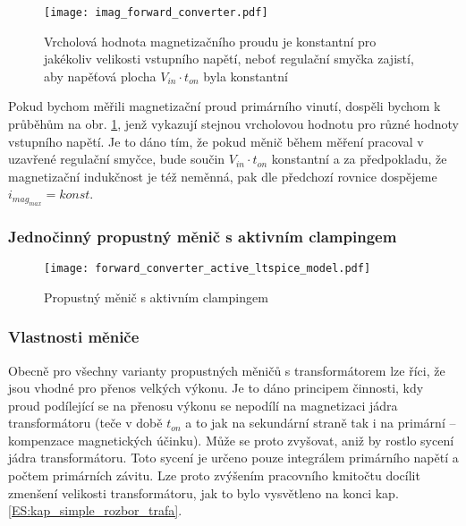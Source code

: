       \begin{figure}[ht!]
      \centering
      \texttt{[image: imag\_forward\_converter.pdf]}
      \caption[Magnetizační proud]{Vrcholová hodnota magnetizačního proudu je konstantní pro
               jakékoliv velikosti vstupního napětí, neboť regulační smyčka zajistí, aby napěťová
               plocha $V_{in}\cdot t_{on}$ byla konstantní}
      \label{enz:fig_imag_forward_converter}
      \end{figure}
      
      Pokud bychom měřili magnetizační proud primárního vinutí, dospěli bychom k průběhům na obr.
      \ref{enz:fig_imag_forward_converter}, jenž vykazují stejnou vrcholovou hodnotu pro různé hodnoty
      vstupního napětí. Je to dáno tím, že pokud měnič během měření pracoval v uzavřené regulační
      smyčce, bude součin $V_{in}\cdot t_{on}$ konstantní a za předpokladu, že magnetizační indukčnost
      je též neměnná, pak dle předchozí rovnice dospějeme $i_{mag_{max}} = konst$.
     
    \subsubsection{Jednočinný propustný měnič s aktivním clampingem}\label{ENZ:kap_afwdconv}  
      \begin{figure*}[ht!]
        \centering
        \texttt{[image: forward\_converter\_active\_ltspice\_model.pdf]}
        \caption[Propustný měnič s aktivním clampingem]{Propustný měnič s aktivním clampingem}
        \label{enz:fig_imag_a_lt_frwd_conv}
      \end{figure*}   
      
    \subsubsection{Vlastnosti měniče}
      Obecně pro všechny varianty  propustných měničů s transformátorem lze říci, že jsou vhodné pro
      přenos velkých výkonu. Je to dáno principem činnosti, kdy proud podílející se na přenosu výkonu
      se nepodílí na magnetizaci jádra transformátoru (teče v době $t_{on}$ a to jak na sekundární
      straně tak i na primární – kompenzace magnetických účinku). Může se proto zvyšovat, aniž by
      rostlo sycení jádra transformátoru. Toto sycení je určeno pouze integrálem primárního napětí a
      počtem primárních závitu. Lze proto zvýšením pracovního kmitočtu docílit zmenšení velikosti
      transformátoru, jak to bylo vysvětleno na konci kap. \ref{ES:kap_simple_rozbor_trafa}.
 
